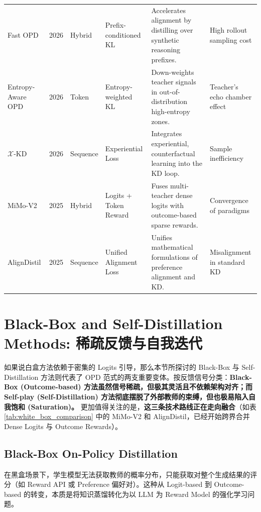 \begin{table}[tbp]
{\begin{tabular}{l c l l p{6cm} p{3.5cm}}
        Fast OPD & 2026 & Hybrid & Prefix-conditioned KL & Accelerates alignment by distilling over synthetic reasoning prefixes. & High rollout sampling cost \\
        Entropy-Aware OPD& 2026 & Token & Entropy-weighted KL & Down-weights teacher signals in out-of-distribution high-entropy zones. & Teacher's echo chamber effect \\
        $\mathcal{X}$-KD & 2026 & Sequence & Experiential Loss & Integrates experiential, counterfactual learning into the KD loop. & Sample inefficiency \\
        MiMo-V2 & 2025 & Hybrid & Logits + Token Reward & Fuses multi-teacher dense logits with outcome-based sparse rewards. & Convergence of paradigms \\
        AlignDistil & 2025 & Sequence & Unified Alignment Loss & Unifies mathematical formulations of preference alignment and KD. & Misalignment in standard KD \\
        \bottomrule
    \end{tabular}
    }
\end{table}


\section{Black-Box and Self-Distillation Methods: 稀疏反馈与自我迭代}
\label{sec:black_box}

如果说白盒方法依赖于密集的 Logits 引导，那么本节所探讨的 Black-Box 与 Self-Distillation 方法则代表了 OPD 范式的两支重要变体。按反馈信号分类：\textbf{Black-Box (Outcome-based) 方法虽然信号稀疏，但极其灵活且不依赖架构对齐；而 Self-play (Self-Distillation) 方法彻底摆脱了外部教师的束缚，但也极易陷入自我饱和 (Saturation)。} 更加值得关注的是，\textbf{这三条技术路线正在走向融合}（如表 \ref{tab:white_box_comparison} 中的 MiMo-V2 和 AlignDistil，已经开始跨界合并 Dense Logits 与 Outcome Rewards）。

\subsection{Black-Box On-Policy Distillation}
\label{subsec:black_box_opd}

在黑盒场景下，学生模型无法获取教师的概率分布，只能获取对整个生成结果的评分（如 Reward API 或 Preference 偏好对）。这种从 Logit-based 到 Outcome-based 的转变，本质是将知识蒸馏转化为以 LLM 为 Reward Model 的强化学习问题。

